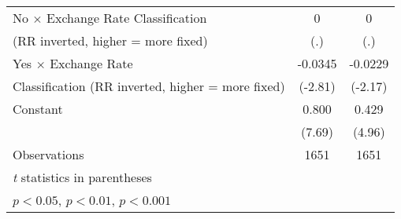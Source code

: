 {\begin{tabular}{l*{2}{c}}
\addlinespace
No $\times$ Exchange Rate Classification&    0         &    0         \\
(RR inverted, higher = more fixed)      &  (.)         &  (.)         \\
\addlinespace
Yes $\times$ Exchange Rate              &-0.0345\sym{**} &-0.0229\sym{*}  \\
Classification (RR inverted, higher = more fixed)&(-2.81)         &(-2.17)         \\
\addlinespace
Constant                                &0.800\sym{***}&0.429\sym{***}\\
                                        &(7.69)         &(4.96)         \\
\midrule
Observations                            & 1651         & 1651         \\
\bottomrule
\multicolumn{3}{l}{\footnotesize \textit{t} statistics in parentheses}\\
\multicolumn{3}{l}{\footnotesize \sym{*} \(p<0.05\), \sym{**} \(p<0.01\), \sym{***} \(p<0.001\)}\\
\end{tabular}
}
